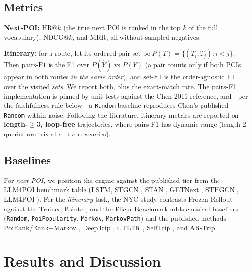 \subsection{Metrics}
\label{sec:sol-exp-metrics}

\textbf{Next-POI:} $\mathrm{HR@}k$ (the true next POI is ranked in the top $k$ of the full
vocabulary), $\mathrm{NDCG@}k$, and $\mathrm{MRR}$, all without sampled negatives.

\textbf{Itinerary:} for a route, let its ordered-pair set be
$P(T)=\{(T_i,T_j):i<j\}$. Then
$\text{pairs-F1}$ is the F1 over $P(\hat{Y})$ vs $P(Y)$ (a pair counts only if both POIs appear
in both routes \emph{in the same order}), and $\text{set-F1}$ is the order-agnostic F1 over the
visited \emph{sets}. We report both, plus the exact-match rate. The pairs-F1 implementation is
pinned by unit tests against the Chen-2016 reference, and---per the faithfulness rule below---a
\texttt{Random} baseline reproduces Chen's published \texttt{Random} within noise. Following the
literature, itinerary metrics are reported on \textbf{length-$\ge\!3$, loop-free} trajectories,
where pairs-F1 has dynamic range (length-2 queries are trivial $s\!\to\!e$ recoveries).

\subsection{Baselines}
\label{sec:sol-exp-baselines}

For \emph{next-POI}, we position the engine against the published tier from the LLM4POI
benchmark table (LSTM, STGCN \cite{yu2018stgcn}, STAN \cite{luo2021stan}, GETNext
\cite{yang2022getnext}, STHGCN \cite{yan2023sthgcn}, LLM4POI \cite{li2024llm4poi}). For the
\emph{itinerary} task, the NYC study contrasts Frozen Rollout against the Trained Pointer, and
the Flickr Benchmark adds classical baselines (\texttt{Random}, \texttt{PoiPopularity},
\texttt{Markov}, \texttt{MarkovPath}) and the published methods PoiRank/Rank+Markov
\cite{chen2016learning}, DeepTrip \cite{gao2019deeptrip}, CTLTR \cite{zhou2021ctltr}, SelfTrip
\cite{gao2022selftrip}, and AR-Trip \cite{shu2024artrip}.

\section{Results and Discussion}
\label{sec:sol-results}

